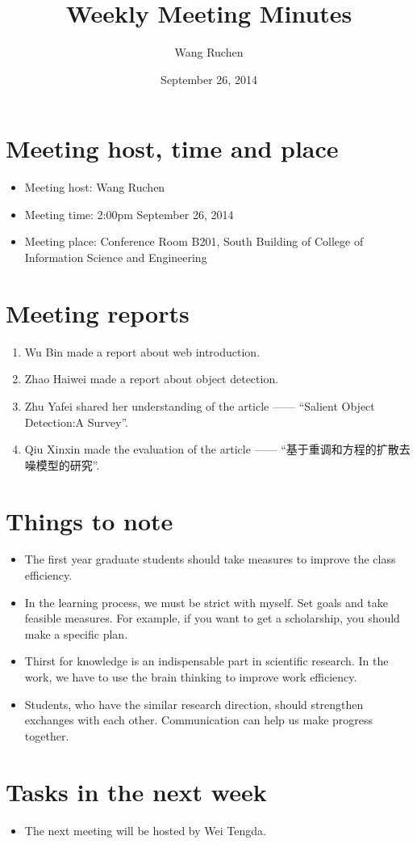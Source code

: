 \documentclass[a4paper，12pt]{article}
\title{Weekly Meeting Minutes}
\author{Wang Ruchen}
\date{September 26, 2014}
\begin{document}
\maketitle

\section{Meeting host, time and place}

\begin{itemize}
\item Meeting host: Wang Ruchen
\item Meeting time: 2:00pm September 26, 2014 
\item Meeting place: Conference Room B201, South Building of College of Information Science and Engineering 
\end{itemize}

\section{Meeting reports}

\begin{enumerate}
\item Wu Bin made a report about web introduction. 
\item Zhao Haiwei made a report about object detection.
\item Zhu Yafei shared her understanding of the article —— ``Salient Object Detection:A Survey''.
\item Qiu Xinxin made the evaluation of the article —— ``基于重调和方程的扩散去噪模型的研究''.
\end{enumerate}

\section {Things to note}

\begin{itemize}
\item The first year graduate students should take measures to improve the class efficiency.
\item In the learning process, we must be strict with myself. Set goals and take feasible measures. For example, if you want to get a scholarship, you should make a specific plan.
\item Thirst for knowledge is an indispensable part in scientific research. In the work, we have to use the brain thinking to improve work efficiency.
\item Students, who have the similar research direction, should strengthen exchanges with each other. Communication can help us make progress together.
\end{itemize}

\section {Tasks in the next week }

\begin{itemize}
\item The next meeting will be hosted by Wei Tengda.
\end{itemize}
\end{document}
